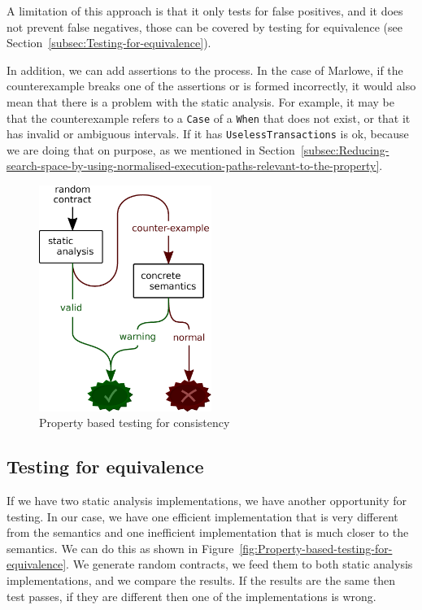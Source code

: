 \documentclass[english,runningheads]{llncs}
\begin{document}
A limitation of this approach is that it only tests for false positives,
and it does not prevent false negatives, those can be covered by testing
for equivalence (see Section~\ref{subsec:Testing-for-equivalence}).

In addition, we can add assertions to the process. In the case of
Marlowe, if the counterexample breaks one of the assertions or is
formed incorrectly, it would also mean that there is a problem with
the static analysis. For example, it may be that the counterexample
refers to a \texttt{Case} of a \texttt{When} that does not exist,
or that it has invalid or ambiguous intervals. If it has \texttt{UselessTransactions}
is ok, because we are doing that on purpose, as we mentioned in Section~\ref{subsec:Reducing-search-space-by-using-normalised-execution-paths-relevant-to-the-property}.

\begin{figure}
\begin{centering}
\includegraphics[width=0.5\textwidth]{figures/consistency_property}
\par\end{centering}
\caption{Property based testing for consistency\label{fig:Property-based-testing-for-consistency}}

\end{figure}


\subsection{Testing for equivalence\label{subsec:Testing-for-equivalence} }

If we have two static analysis implementations, we have another opportunity
for testing. In our case, we have one efficient implementation that
is very different from the semantics and one inefficient implementation
that is much closer to the semantics. We can do this as shown in Figure~\ref{fig:Property-based-testing-for-equivalence}.
We generate random contracts, we feed them to both static analysis
implementations, and we compare the results. If the results are the
same then test passes, if they are different then one of the implementations
is wrong.
\end{document}
